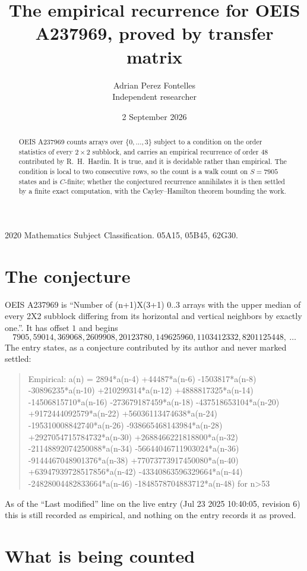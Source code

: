 \documentclass[11pt,a4paper]{article}
\title{The empirical recurrence for OEIS A237969, proved by transfer matrix}
\author{Adrian Perez Fontelles\\ \small Independent researcher}
\date{2 September 2026}
\theoremstyle{plain}
\theoremstyle{definition}
\begin{document}
\maketitle

\begin{abstract}
OEIS A237969 counts arrays over $\{0,\dots,3\}$ subject to a condition on the order
statistics of every $2\times2$ subblock, and carries an empirical recurrence of order
$48$ contributed by R.~H.~Hardin. It is true, and it is decidable rather than empirical.
The condition is local to two consecutive rows, so the count is a walk count on $S=7905$
states and is $C$-finite; whether the conjectured recurrence annihilates it is then settled by
a finite exact computation, with the Cayley--Hamilton theorem bounding the work.
\end{abstract}

\noindent\small 2020 Mathematics Subject Classification. 05A15, 05B45, 62G30.\normalsize

\section{The conjecture}

OEIS A237969 is ``Number of (n+1)X(3+1) 0..3 arrays with the upper median of every 2X2 subblock differing from its horizontal and vertical neighbors by exactly one.''. It has offset $1$ and begins
\[
7905, 59014, 369068, 2609908, 20123780, 149625960, 1103412332, 8201125448,\ \dots
\]
The entry states, as a conjecture contributed by its author and never marked settled:
\begin{quote}
Empirical: a(n) = 2894*a(n-4) +44487*a(n-6) -1503817*a(n-8) -30896235*a(n-10) +210299314*a(n-12) +4888817325*a(n-14) -14506815710*a(n-16) -273679187459*a(n-18) -437518653104*a(n-20) +9172444092579*a(n-22) +56036113474638*a(n-24) -195310008842740*a(n-26) -938665468143984*a(n-28) +2927054715784732*a(n-30) +2688466221818800*a(n-32) -21148892074250088*a(n-34) -56644046711903024*a(n-36) -9144467048901376*a(n-38) +77073773917450080*a(n-40) +63947939728517856*a(n-42) -43340863596329664*a(n-44) -24828004482833664*a(n-46) -1848578704883712*a(n-48) for n>53
\end{quote}
As of the ``Last modified'' line on the live entry (Jul 23 2025 10:40:05, revision 6) this is still
recorded as empirical, and nothing on the entry records it as proved.

\section{What is being counted}
\end{document}

